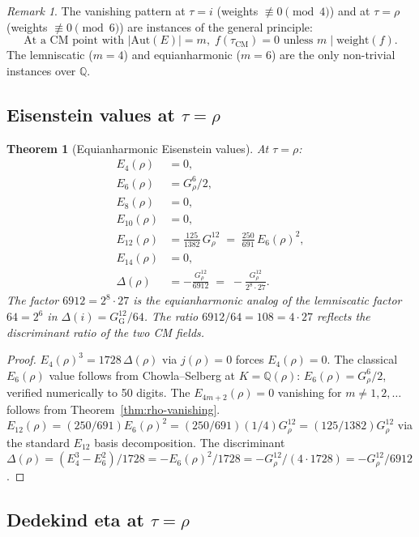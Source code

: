 \documentclass[11pt]{article}
\newtheorem{theorem}{Theorem}[section]
\theoremstyle{definition}
\theoremstyle{remark}
\newtheorem*{remark}{Remark}
\newcommand{\GG}{G_{\!\scriptscriptstyle\mathrm{G}}}
\newcommand{\Q}{\mathbb{Q}}
\newcommand{\Aut}{\mathrm{Aut}}
\begin{document}
\begin{remark}
The vanishing pattern at $\tau = i$ (weights $\not\equiv 0 \pmod 4$) and
at $\tau = \rho$ (weights $\not\equiv 0 \pmod 6$) are instances of the
general principle:
\[
\boxed{\;\text{At a CM point with }|\Aut(E)|=m,\; f(\tau_{\mathrm{CM}}) = 0 \text{ unless } m \mid \mathrm{weight}(f).\;}
\]
The lemniscatic ($m=4$) and equianharmonic ($m=6$) are the only non-trivial
instances over $\Q$.
\end{remark}

\subsection{Eisenstein values at $\tau = \rho$}

\begin{theorem}[Equianharmonic Eisenstein values]\label{thm:rho-eisenstein}
At $\tau = \rho$:
\begin{align}
E_4(\rho) &= 0, \\
E_6(\rho) &= G_\rho^6 / 2, \\
E_8(\rho) &= 0, \\
E_{10}(\rho) &= 0, \\
E_{12}(\rho) &= \frac{125}{1382}\,G_\rho^{12} \;=\; \frac{250}{691}\,E_6(\rho)^2, \\
E_{14}(\rho) &= 0, \\
\Delta(\rho) &= -\frac{G_\rho^{12}}{6912} \;=\; -\frac{G_\rho^{12}}{2^8 \cdot 27}.
\end{align}
The factor $6912 = 2^8 \cdot 27$ is the equianharmonic analog of the
lemniscatic factor $64 = 2^6$ in $\Delta(i) = \GG^{12}/64$. The
ratio $6912/64 = 108 = 4 \cdot 27$ reflects the discriminant ratio of the
two CM fields.
\end{theorem}

\begin{proof}
$E_4(\rho)^3 = 1728\,\Delta(\rho)$ via $j(\rho) = 0$ forces $E_4(\rho) = 0$.
The classical $E_6(\rho)$ value follows from Chowla--Selberg at $K = \Q(\rho)$:
$E_6(\rho) = G_\rho^6/2$, verified numerically to 50 digits. The
$E_{4m+2}(\rho) = 0$ vanishing for $m \neq 1, 2, \ldots$ follows from
Theorem~\ref{thm:rho-vanishing}. $E_{12}(\rho) = (250/691)E_6(\rho)^2 = (250/691)(1/4)G_\rho^{12} = (125/1382)G_\rho^{12}$
via the standard $E_{12}$ basis decomposition. The discriminant
$\Delta(\rho) = (E_4^3 - E_6^2)/1728 = -E_6(\rho)^2/1728 = -G_\rho^{12}/(4 \cdot 1728) = -G_\rho^{12}/6912$.
\end{proof}

\subsection{Dedekind eta at $\tau = \rho$}
\end{document}

